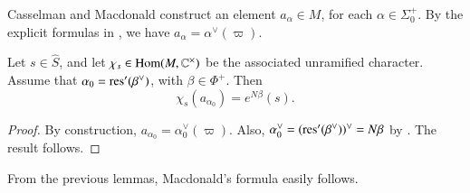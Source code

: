 Casselman and Macdonald construct an element $a_{\alpha}\in M$, for each $\alpha\in\Sigma^+_0$.
By the explicit formulas in \cite{casselman2005companion}, 
we have $a_\alpha = \alpha^\vee(\varpi)$.

\begin{lemma}\label{lemma:translate} 
Let $s\in \hat S$, and let $\chi_s\in{\operatorname{Hom}}(M,\mathbb{C}^\times)$ be the associated
unramified character.  Assume that $\alpha_0 = {\operatorname{res}}'(\beta^\vee)$, with $\beta\in\Phi^+$.
Then
\[
\chi_s(a_{\alpha_0}) = e^{N\beta}(s).
\]
\end{lemma}

\begin{proof}  
By construction, $a_{\alpha_0} = \alpha_0^\vee(\varpi)$.  
Also, $\alpha_0^\vee = ({\operatorname{res}}'(\beta^\vee))^\vee = N\beta$ by \cite[1.3.9]{kottwitz1999foundations}.
The result follows. 
\end{proof}

From the previous lemmas, Macdonald's formula  easily follows.

